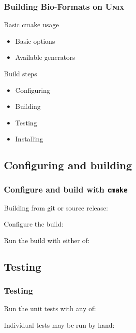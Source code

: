 \documentclass{beamer}
\newcommand{\cmd}[1]{\textbf{\texttt{#1}}}
\begin{document}
\begin{frame}
  \frametitle{Building Bio-Formats on U\textsc{nix}}
  \begin{block}{Basic cmake usage}
    \begin{itemize}
      \item Basic options
      \item Available generators
    \end{itemize}
  \end{block}
  \begin{block}{Build steps}
    \begin{itemize}
      \item Configuring
      \item Building
      \item Testing
      \item Installing
    \end{itemize}
  \end{block}
\end{frame}

\subsection{Configuring and building}

\begin{frame}[fragile]
  \frametitle{Configure and build with \cmd{cmake}}
  Building from git or source release:

  Configure the build:

  \begin{semiverbatim}
\end{semiverbatim}

Run the build with either of:

  \begin{semiverbatim}
\end{semiverbatim}
\end{frame}

\subsection{Testing}

\begin{frame}[fragile]
  \frametitle{Testing}
Run the unit tests with any of:

  \begin{semiverbatim}
\end{semiverbatim}

Individual tests may be run by hand:

  \begin{semiverbatim}
\end{semiverbatim}
\end{frame}
\end{document}
